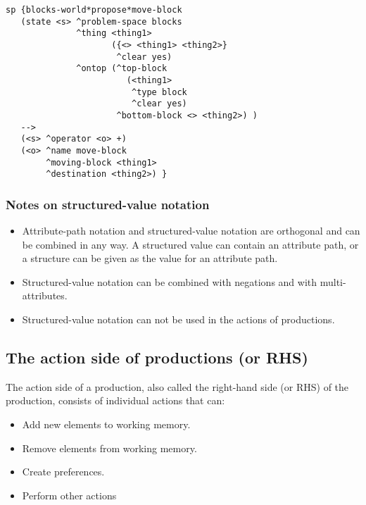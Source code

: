 \begin{verbatim}
sp {blocks-world*propose*move-block
   (state <s> ^problem-space blocks
              ^thing <thing1>
                     ({<> <thing1> <thing2>}
                      ^clear yes)
              ^ontop (^top-block
                        (<thing1>
                         ^type block
                         ^clear yes)
                      ^bottom-block <> <thing2>) )
   -->
   (<s> ^operator <o> +)
   (<o> ^name move-block
        ^moving-block <thing1>
        ^destination <thing2>) }
\end{verbatim}


\subsubsection*{Notes on structured-value notation}

\vspace{-12pt}
\begin{itemize}
	\item
		Attribute-path notation and structured-value notation are orthogonal and can be combined in any way. A structured value can contain an attribute path, or a structure can be given as the value for an attribute path.
	\item
		Structured-value notation can be combined with negations and with multi-attributes.
	\item
		Structured-value notation can not be used in the actions of productions.
\end{itemize}


\subsection{The action side of productions (or RHS)}
\label{SYNTAX-pm-rhs}

The action side of a production, also called the right-hand side (or RHS) of the production, consists of individual actions that can:

\vspace{-8pt}
\begin{itemize}
	\item Add new elements to working memory.
	\vspace{-6pt}
	\item Remove elements from working memory.
	\vspace{-6pt}
	\item Create preferences.
	\vspace{-6pt}
	\item Perform other actions
	\vspace{-6pt}
\end{itemize}


